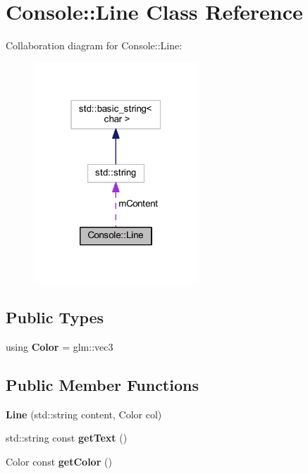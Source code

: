 \hypertarget{class_console_1_1_line}{}\section{Console\+:\+:Line Class Reference}
\label{class_console_1_1_line}


Collaboration diagram for Console\+:\+:Line\+:
\nopagebreak
\begin{figure}[H]
\begin{center}
\leavevmode
\includegraphics[width=175pt]{class_console_1_1_line__coll__graph}
\end{center}
\end{figure}
\subsection*{Public Types}
\begin{DoxyCompactItemize}
\item 
using {\bfseries Color} = glm\+::vec3\hypertarget{class_console_1_1_line_ad91533fb32916632a9899e571dc627dc}{}\label{class_console_1_1_line_ad91533fb32916632a9899e571dc627dc}

\end{DoxyCompactItemize}
\subsection*{Public Member Functions}
\begin{DoxyCompactItemize}
\item 
{\bfseries Line} (std\+::string content, Color col)\hypertarget{class_console_1_1_line_a99c8853bfc5915263acd0b89ff2c6303}{}\label{class_console_1_1_line_a99c8853bfc5915263acd0b89ff2c6303}

\item 
std\+::string const {\bfseries get\+Text} ()\hypertarget{class_console_1_1_line_a83776e5e351fa767f08e4634d830a84b}{}\label{class_console_1_1_line_a83776e5e351fa767f08e4634d830a84b}

\item 
Color const {\bfseries get\+Color} ()\hypertarget{class_console_1_1_line_a9ff2eac44fc6b818abe7fea2e229bb8a}{}\label{class_console_1_1_line_a9ff2eac44fc6b818abe7fea2e229bb8a}

\end{DoxyCompactItemize}
